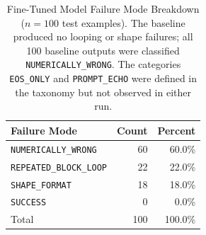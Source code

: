 \vspace{1.5cm}

\begin{table}[h!]
\centering
\caption{Fine-Tuned Model Failure Mode Breakdown ($n = 100$ test examples). The baseline produced no looping or shape failures; all 100 baseline outputs were classified \texttt{NUMERICALLY\_WRONG}. The categories \texttt{EOS\_ONLY} and \texttt{PROMPT\_ECHO} were defined in the taxonomy but not observed in either run.}
\label{tab:failure_modes}
\begin{tabular}{lrr}
\toprule
\textbf{Failure Mode} & \textbf{Count} & \textbf{Percent} \\
\midrule
\texttt{NUMERICALLY\_WRONG} & 60 & 60.0\% \\
\texttt{REPEATED\_BLOCK\_LOOP} & 22 & 22.0\% \\
\texttt{SHAPE\_FORMAT} & 18 & 18.0\% \\
\texttt{SUCCESS} & 0 & 0.0\% \\
\midrule
Total & 100 & 100.0\% \\
\bottomrule
\end{tabular}
\end{table}
